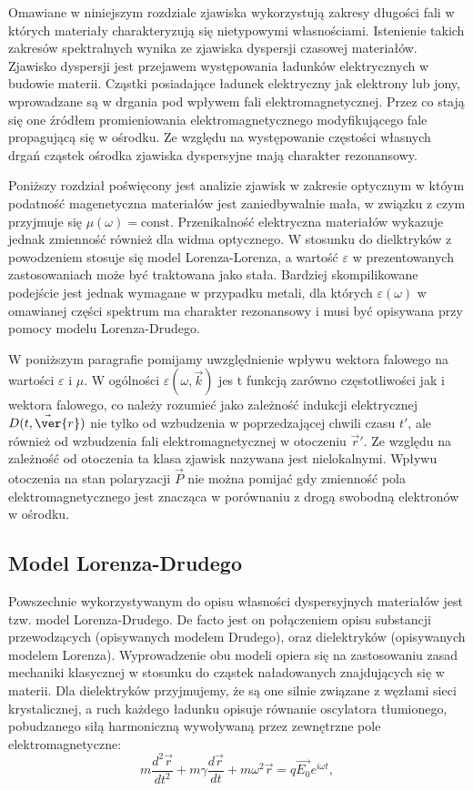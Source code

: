Omawiane w niniejszym rozdziale zjawiska wykorzystują zakresy długości fali w których materiały charakteryzują się nietypowymi własnościami. Istenienie takich zakresów spektralnych wynika ze zjawiska dyspersji czasowej materiałów. Zjawisko dyspersji jest przejawem występowania ładunków elektrycznych w budowie materii. Cząstki posiadające ładunek elektryczny jak elektrony lub jony, wprowadzane są w drgania pod wpływem fali elektromagnetycznej. Przez co stają się one źródłem promieniowania elektromagnetycznego modyfikującego fale propagującą się w ośrodku. Ze względu na występowanie częstości własnych drgań cząstek ośrodka zjawiska dyspersyjne mają charakter rezonansowy.

Poniższy rozdział poświęcony jest analizie zjawisk w zakresie optycznym w któym podatność magenetyczna materiałów jest zaniedbywalnie mała, w związku z czym przyjmuje się $\mu(\omega)=\textrm{const}$. Przenikalność elektryczna materiałów wykazuje jednak zmienność również dla widma optycznego. W stosunku do dielktryków z powodzeniem stosuje się model Lorenza-Lorenza, a wartość $\varepsilon$ w prezentowanych zastosowaniach może być traktowana jako stała. Bardziej skompilikowane podejście jest jednak wymagane w przypadku metali, dla których $\varepsilon(\omega)$ w omawianej części spektrum ma charakter rezonansowy i musi być opisywana przy pomocy modelu Lorenza-Drudego.

W poniższym paragrafie pomijamy uwzględnienie wpływu wektora falowego na wartości $\varepsilon$ i $\mu$. W ogólności $\varepsilon(\omega,\vec{k})$ jes t funkcją zarówno częstotliwości jak i wektora falowego, co należy rozumieć jako zależność indukcji elektrycznej $\vec{D(t,\ver{r})}$ nie tylko od wzbudzenia w poprzedzającej chwili czasu $t'$, ale również od wzbudzenia fali elektromagnetycznej w otoczeniu $\vec{r}'$. Ze względu na zależność od otoczenia ta klasa zjawisk nazywana jest nielokalnymi. Wpływu otoczenia na stan polaryzacji $\vec{P}$ nie można pomijać gdy zmienność pola elektromagnetycznego jest znacząca w porównaniu z drogą swobodną elektronów w ośrodku.

\subsection{Model Lorenza-Drudego}
Powszechnie wykorzystywanym do opisu własności dyspersyjnych materiałów jest tzw. model Lorenza-Drudego. De facto jest on połączeniem opisu substancji przewodzących (opisywanych modelem Drudego), oraz dielektryków (opisywanych modelem Lorenza). Wyprowadzenie obu modeli opiera się na zastosowaniu zasad mechaniki klasycznej w stosunku do cząstek naładowanych znajdujących się w materii. Dla dielektryków przyjmujemy, że są one silnie związane z węzłami sieci krystalicznej, a ruch każdego ładunku opisuje równanie oscylatora tłumionego, pobudzanego siłą harmoniczną wywoływaną przez zewnętrzne pole elektromagnetyczne:
\begin{equation}
m \frac{d^2 \vec{r}}{dt^2} + m \gamma \frac{d \vec{r}}{dt} + m \omega^2 \vec{r} = q \vec{E_0} e^{i \omega t},
\label{eq:newton-lorenz}
\end{equation}

